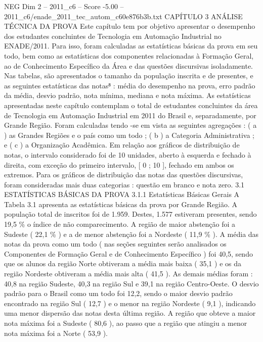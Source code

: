 \begin{textsample}{NEG Dim 2 – 2011\_c6 – Score -5.00 – 2011\_c6/enade\_2011\_tec\_autom\_c60e876b3b.txt}  \label{ex:f2_neg_025}
CAPÍTULO 3 ANÁLISE TÉCNICA DA PROVA Este capítulo tem por objetivo apresentar o desempenho dos estudantes concluintes de Tecnologia em Automação Industrial no ENADE/2011.
Para isso, foram calculadas as estatísticas básicas da prova em seu todo, bem como as estatísticas dos componentes relacionadas à Formação Geral, ao de Conhecimento Específico da Área e das questões discursivas isoladamente.
Nas tabelas, são apresentados o tamanho da população inscrita e de presentes, e as seguintes estatísticas das notas⁸ : média do desempenho na prova, erro padrão da média, desvio padrão, nota mínima, mediana e nota máxima.
As estatísticas apresentadas neste capítulo contemplam o total de estudantes concluintes da área de Tecnologia em Automação Industrial em 2011 do Brasil e, separadamente, por Grande Região.
Foram calculadas tendo -se em vista as seguintes agregações : ( a ) as Grandes Regiões e o país como um todo ; ( b ) a Categoria Administrativa ; e ( c ) a Organização Acadêmica.
Em relação aos gráficos de distribuição de notas, o intervalo considerado foi de 10 unidades, aberto à esquerda e fechado à direita, com exceção do primeiro intervalo, [ 0 ; 10 ], fechado em ambos os extremos.
Para os gráficos de distribuição das notas das questões discursivas, foram consideradas mais duas categorias : questão em branco e nota zero. 3.1 ESTATÍSTICAS BÁSICAS DA PROVA 3.1.1 Estatísticas Básicas Gerais A Tabela 3.1 apresenta as estatísticas básicas da prova por Grande Região.
A população total de inscritos foi de 1.959.
Destes, 1.577 estiveram presentes, sendo 19,5 \% o índice de não comparecimento.
A região de maior abstenção foi a Sudeste ( 22,1 \% ) e a de menor abstenção foi a Nordeste ( 11,9 \% ).
A média das notas da prova como um todo ( nas seções seguintes serão analisados os Componentes de Formação Geral e de Conhecimento Específico ) foi 40,5, sendo que os alunos da região Norte obtiveram a média mais baixa ( 35,1 ) e os da região Nordeste obtiveram a média mais alta ( 41,5 ).
As demais médias foram : 40,8 na região Sudeste, 40,3 na região Sul e 39,1 na região Centro-Oeste.
O desvio padrão para o Brasil como um todo foi 12,2, sendo o maior desvio padrão encontrado na região Sul ( 12,7 ) e o menor na região Nordeste ( 9,1 ), indicando uma menor dispersão das notas desta última região.
A região que obteve a maior nota máxima foi a Sudeste ( 80,6 ), ao passo que a região que atingiu a menor nota máxima foi a Norte ( 53,9 ).

\end{textsample}
